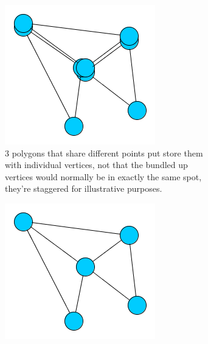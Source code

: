 \begin{figure}
        \centering
        \begin{subfigure}[b]{0.48\textwidth}
                \includegraphics[width=\textwidth]{img/vertex_overlay0.png}
                \caption{3 polygons that share different points put store them
                with individual vertices, not that the bundled up vertices would
                normally be in exactly the same spot, they're staggered for
                illustrative purposes.}
                \label{fig:vertex-overlay0}
        \end{subfigure}%
        \hspace{10px} %
        \begin{subfigure}[b]{0.48\textwidth}
                \includegraphics[width=\textwidth]{img/vertex_overlay1.png}

\end{subfigure}
\end{figure}
